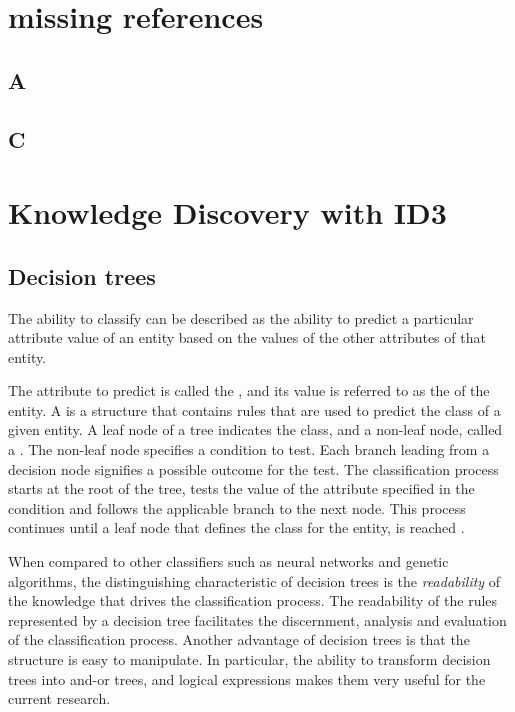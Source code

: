 \chapter{missing references}
\section{A}\label{sec:encoding_examples}

\section{C}\label{tab:attribute_regions}

\chapter{Knowledge Discovery with ID3}

\section{Decision trees}
\label{sec:decision_tree}   
 The ability to classify can be described as the ability to predict a particular attribute value of an entity based on the values of the other attributes of that entity.  

  The attribute to predict is called the , and its value is referred to as the  of the entity. A  is a structure that contains rules that are used to predict the class of a given entity.  A leaf node of a tree indicates the class, and a non-leaf node, called a . The non-leaf node specifies a condition to test. Each branch leading from a decision node signifies a possible outcome for the test.  The classification process starts at the root of the tree, tests the value of the attribute specified in the condition and follows the applicable branch to the next node. This process continues until a leaf node that defines the class for the entity, is reached \cite{jackson:learning}.

When compared to other classifiers such as neural networks and genetic algorithms, the distinguishing characteristic of decision trees is the {\sl readability} of the knowledge that drives the classification process.  The readability of the rules represented by a decision tree facilitates the discernment, analysis and evaluation of the classification process.  Another advantage of decision trees is that the structure is easy to manipulate.  In particular, the ability to transform decision trees into and-or trees, and logical expressions makes them very useful for the current research.

